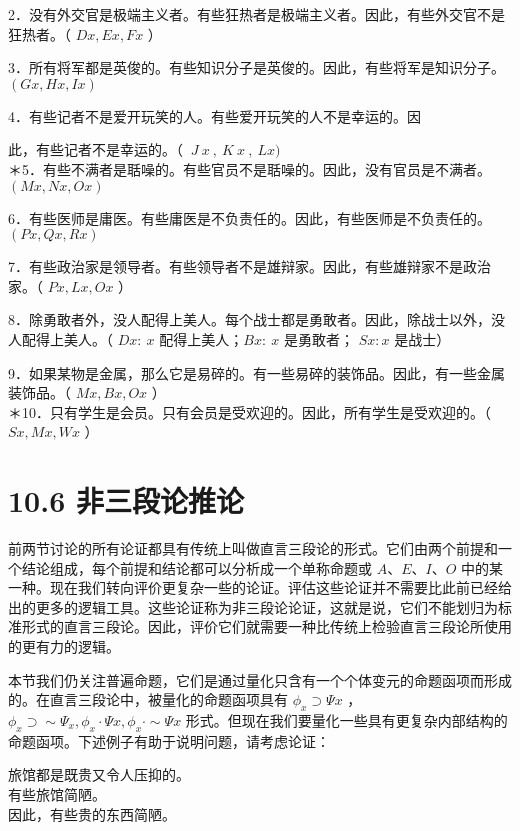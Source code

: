 2．没有外交官是极端主义者。有些狂热者是极端主义者。因此，有些外交官不是狂热者。（ $D x, E x, F x$ ）

3．所有将军都是英俊的。有些知识分子是英俊的。因此，有些将军是知识分子。 $(G x, H x, I x)$

4．有些记者不是爱开玩笑的人。有些爱开玩笑的人不是幸运的。因

此，有些记者不是幸运的。（ $~ J ~ x ~, ~ K ~ x ~, ~ L x)$\\
＊5．有些不满者是聒噪的。有些官员不是聒噪的。因此，没有官员是不满者。 $(M x, N x, O x)$

6．有些医师是庸医。有些庸医是不负责任的。因此，有些医师是不负责任的。 $(P x, Q x, R x)$

7．有些政治家是领导者。有些领导者不是雄辩家。因此，有些雄辩家不是政治家。（ $P x, L x, O x$ ）

8．除勇敢者外，没人配得上美人。每个战士都是勇敢者。因此，除战士以外，没人配得上美人。（ $D x: ~ x$ 配得上美人；$B x: ~ x$ 是勇敢者； $S x: x$ 是战士）

9．如果某物是金属，那么它是易碎的。有一些易碎的装饰品。因此，有一些金属装饰品。（ $M x, B x, O x$ ）\\
＊10．只有学生是会员。只有会员是受欢迎的。因此，所有学生是受欢迎的。（ $S x, M x, W x$ ）

\section*{10.6 非三段论推论}
前两节讨论的所有论证都具有传统上叫做直言三段论的形式。它们由两个前提和一个结论组成，每个前提和结论都可以分析成一个单称命题或 $A 、 E 、 I 、 O$ 中的某一种。现在我们转向评价更复杂一些的论证。评估这些论证并不需要比此前已经给出的更多的逻辑工具。这些论证称为非三段论论证，这就是说，它们不能划归为标准形式的直言三段论。因此，评价它们就需要一种比传统上检验直言三段论所使用的更有力的逻辑。

本节我们仍关注普遍命题，它们是通过量化只含有一个个体变元的命题函项而形成的。在直言三段论中，被量化的命题函项具有 $\phi_{x} \supset \Psi x$ ， $\phi_{x} \supset \sim \Psi_{x}, \phi_{x} \cdot \Psi x, \phi_{x} \cdot \sim \Psi x$ 形式。但现在我们要量化一些具有更复杂内部结构的命题函项。下述例子有助于说明问题，请考虑论证：

\begin{displayquote}
旅馆都是既贵又令人压抑的。\\
有些旅馆简陋。\\
因此，有些贵的东西简陋。
\end{displayquote}

